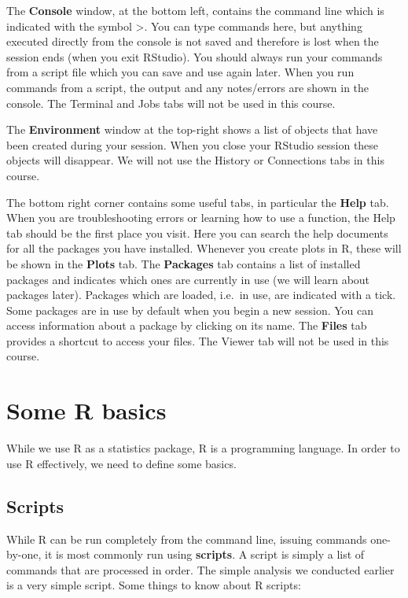 \documentclass[
]{memoir}
\begin{document}
The \textbf{Console} window, at the bottom left, contains the command line which is indicated with the symbol \textgreater. You can type commands here, but anything executed directly from the console is not saved and therefore is lost when the session ends (when you exit RStudio). You should always run your commands from a script file which you can save and use again later. When you run commands from a script, the output and any notes/errors are shown in the console. The Terminal and Jobs tabs will not be used in this course.

The \textbf{Environment} window at the top-right shows a list of objects that have been created during your session. When you close your RStudio session these objects will disappear. We will not use the History or Connections tabs in this course.

The bottom right corner contains some useful tabs, in particular the \textbf{Help} tab. When you are troubleshooting errors or learning how to use a function, the Help tab should be the first place you visit. Here you can search the help documents for all the packages you have installed. Whenever you create plots in R, these will be shown in the \textbf{Plots} tab. The \textbf{Packages} tab contains a list of installed packages and indicates which ones are currently in use (we will learn about packages later). Packages which are loaded, i.e.~in use, are indicated with a tick. Some packages are in use by default when you begin a new session. You can access information about a package by clicking on its name. The \textbf{Files} tab provides a shortcut to access your files. The Viewer tab will not be used in this course.

\hypertarget{some-r-basics}{%
\section{Some R basics}\label{some-r-basics}}

While we use R as a statistics package, R is a programming language. In order to use R effectively, we need to define some basics.

\hypertarget{scripts}{%
\subsection{Scripts}\label{scripts}}

While R can be run completely from the command line, issuing commands one-by-one, it is most commonly run using \textbf{scripts}. A script is simply a list of commands that are processed in order. The simple analysis we conducted earlier is a very simple script. Some things to know about R scripts:
\end{document}
